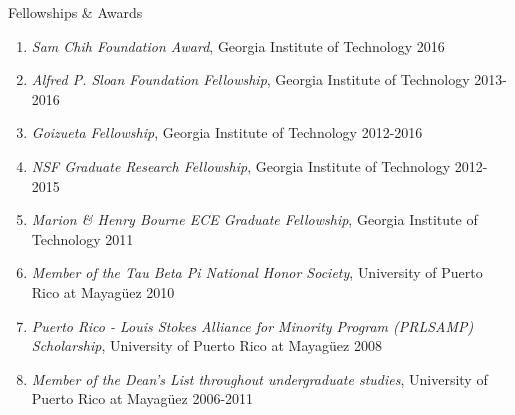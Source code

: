 \documentclass{resume} %
\newcommand{\simplelistentry}[3]{\textit{#1}, {#2} \hfill {#3}}
\newcommand{\fixme}{\textcolor{red}{\textbf{fix me}} \space}
\newcommand{\attention}[1]{\noindent \fixme \textcolor{red}{#1}}
\begin{document}
\begin{rSection}{Fellowships \& Awards}

\begin{enumerate}


\item \simplelistentry{Sam Chih Foundation Award}{Georgia Institute of
    Technology}{2016}

\item \simplelistentry{Alfred P. Sloan Foundation Fellowship}{Georgia Institute
    of Technology}{2013-2016}

\item \simplelistentry{Goizueta Fellowship}{Georgia Institute of
    Technology}{2012-2016}

\item \simplelistentry{NSF Graduate Research Fellowship}{Georgia Institute of
    Technology}{2012-2015}

\item \simplelistentry{Marion \& Henry Bourne ECE Graduate Fellowship}{Georgia
    Institute of Technology}{2011}

\item \simplelistentry{Member of the Tau Beta Pi National Honor
    Society}{University of Puerto Rico at Mayag\"{u}ez}{2010}

\item \simplelistentry{Puerto Rico - Louis Stokes Alliance for Minority Program
    (PRLSAMP) Scholarship}{University of Puerto Rico at Mayag\"{u}ez}{2008}

\item \simplelistentry{Member of the Dean's List throughout undergraduate
    studies}{University of Puerto Rico at Mayag\"{u}ez}{2006-2011}

\end{enumerate}

\end{rSection}







\end{document}

